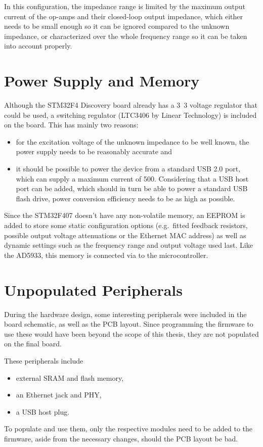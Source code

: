 In this configuration, the impedance range is limited by the maximum output current of the
op-amps and their closed-loop output impedance, which either needs to be small enough so it can be ignored compared
to the unknown impedance, or characterized over the whole frequency range so it can be taken into account properly.


\section{Power Supply and Memory}

Although the STM32F4 Discovery board already has a \unit{3.3}{\volt} voltage regulator that could be used, a
switching regulator (LTC3406 by Linear Technology) is included on the board. This has mainly two reasons:
\begin{itemize}
	\item for the excitation voltage of the unknown impedance to be well known, the power supply needs to be
    reasonably accurate and
  \item it should be possible to power the device from a standard USB 2.0 port, which can supply a maximum current of
    \unit{500}{\milli\ampere}. Considering that a USB host port can be added, which should in turn be able to power
    a standard USB flash drive, power conversion efficiency needs to be as high as possible. 
\end{itemize}

Since the STM32F407 doesn't have any non-volatile memory, an EEPROM is added to store some static configuration
options (e.g.\ fitted feedback resistors, possible output voltage attenuations or the Ethernet MAC address) as well as
dynamic settings such as the frequency range and output voltage used last. Like the AD5933, this memory is connected
via \iic{} to the microcontroller.


\section{Unpopulated Peripherals}

During the hardware design, some interesting peripherals were included in the board schematic, as well as the PCB
layout. Since programming the firmware to use these would have been beyond the scope of this thesis, they are not
populated on the final board.

These peripherals include
\begin{itemize}
  \item external SRAM and flash memory,
	\item an Ethernet jack and PHY,
  \item a USB host plug.
\end{itemize}
To populate and use them, only the respective modules need to be added to the firmware, aside from the necessary
changes, should the PCB layout be bad.
